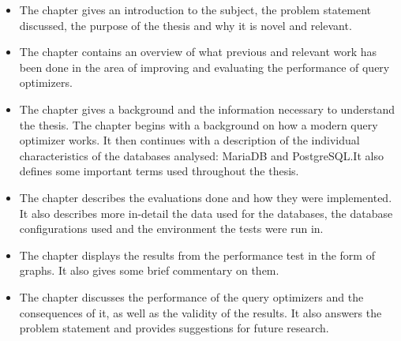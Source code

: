 \begin{itemize}
\item The  chapter gives an introduction to the
  subject, the problem statement discussed, the purpose of
  the thesis and why it is novel and relevant.
\item The  chapter contains an overview of what
  previous and relevant work has been done in the area of improving and
  evaluating the performance of query optimizers.
\item The  chapter gives a background and the information
  necessary to understand the thesis. The chapter begins with a background on
  how a modern query optimizer works. It then continues with a description of
  the individual characteristics of the databases analysed: MariaDB and
  PostgreSQL.\@ It also defines some important terms used throughout the thesis.
\item The  chapter describes the evaluations done and how they
  were implemented. It also describes more in-detail the data used for the
  databases, the database configurations used and the environment the tests were
  run in.
\item The  chapter displays the results from the
  performance test in the form of graphs. It also gives some brief commentary on
  them.
\item The  chapter discusses the performance of the
  query optimizers and the consequences of it, as well as the validity of the
  results. It also answers the problem statement and provides suggestions for
  future research.
\end{itemize}
